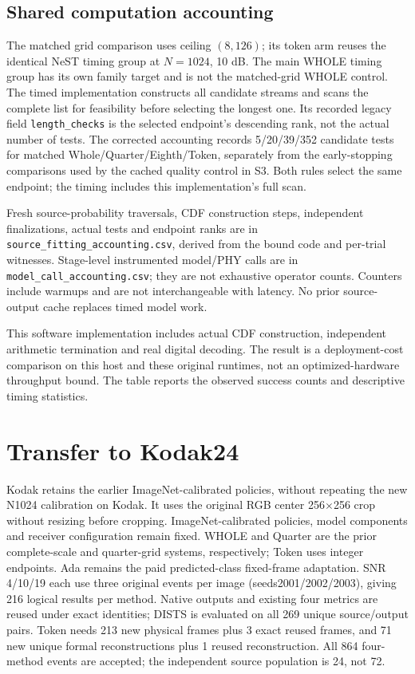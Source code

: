 \documentclass[10pt,letterpaper]{article}
\begin{document}
\subsection{Shared computation accounting}\label{sup:timing-accounting}
The matched grid comparison uses ceiling $(8,126)$; its token arm reuses the identical NeST timing group at $N=1024$, 10 dB. The main WHOLE timing group has its own family target and is not the matched-grid WHOLE control. The timed implementation constructs all candidate streams and scans the complete list for feasibility before selecting the longest one. Its recorded legacy field \texttt{length\_checks} is the selected endpoint's descending rank, not the actual number of tests. The corrected accounting records 5/20/39/352 candidate tests for matched Whole/Quarter/Eighth/Token, separately from the early-stopping comparisons used by the cached quality control in S3. Both rules select the same endpoint; the timing includes this implementation's full scan.

Fresh source-probability traversals, CDF construction steps, independent finalizations, actual tests and endpoint ranks are in \texttt{source\_fitting\_accounting.csv}, derived from the bound code and per-trial witnesses. Stage-level instrumented model/PHY calls are in \texttt{model\_call\_accounting.csv}; they are not exhaustive operator counts. Counters include warmups and are not interchangeable with latency. No prior source-output cache replaces timed model work.

This software implementation includes actual CDF construction, independent arithmetic termination and real digital decoding. The result is a deployment-cost comparison on this host and these original runtimes, not an optimized-hardware throughput bound. The table reports the observed success counts and descriptive timing statistics.


\section{Transfer to Kodak24}\label{sup:8}
Kodak retains the earlier ImageNet-calibrated policies, without repeating the new N1024 calibration on Kodak. It uses the original RGB center 256$\times$256 crop without resizing before cropping. ImageNet-calibrated policies, model components and receiver configuration remain fixed. WHOLE and Quarter are the prior complete-scale and quarter-grid systems, respectively; Token uses integer endpoints. Ada remains the paid predicted-class fixed-frame adaptation. SNR 4/10/19 each use three original events per image (seeds2001/2002/2003), giving 216 logical results per method. Native outputs and existing four metrics are reused under exact identities; DISTS is evaluated on all 269 unique source/output pairs. Token needs 213 new physical frames plus 3 exact reused frames, and 71 new unique formal reconstructions plus 1 reused reconstruction. All 864 four-method events are accepted; the independent source population is 24, not 72.
\end{document}
